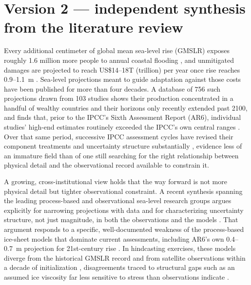 \documentclass[12pt]{article}
\begin{document}
\section*{Version 2 --- independent synthesis from the literature review}

Every additional centimeter of global mean sea-level rise (GMSLR) exposes
roughly 1.6 million more people to annual coastal flooding
\citep{Kulp2019}, and unmitigated damages are projected to reach
US\$14--18T (trillion) per year once rise reaches 0.9--1.1~m
\citep{Jevrejeva2018}. Sea-level projections meant to guide adaptation
against those costs have been published for more than four decades. A
database of 756 such projections drawn from 103 studies shows their
production concentrated in a handful of wealthy countries and their
horizons only recently extended past 2100, and finds that, prior to the
IPCC's Sixth Assessment Report (AR6), individual studies' high-end
estimates routinely exceeded the IPCC's own central ranges
\citep{Garner2026}. Over that same period, successive IPCC assessment
cycles have revised their component treatments and uncertainty structure
substantially \citep{Slangen2022,Garner2018}, evidence less of an immature
field than of one still searching for the right relationship between
physical detail and the observational record available to constrain it.

A growing, cross-institutional view holds that the way forward is not more
physical detail but tighter observational constraint. A recent synthesis
spanning the leading process-based and observational sea-level research
groups argues explicitly for narrowing projections with data and for
characterizing uncertainty structure, not just magnitude, in both the
observations and the models \citep{Felikson2025}. That argument responds
to a specific, well-documented weakness of the process-based ice-sheet
models that dominate current assessments, including AR6's own 0.4--0.7~m
projection for 21st-century rise \citep{Fox-Kemper2021}. In hindcasting
exercises, these models diverge from the historical GMSLR record
\citep{Aschwanden2021} and from satellite observations within a decade of
initialization \citep{Fricker2025}, disagreements traced to structural
gaps such as an assumed ice viscosity far less sensitive to stress than
observations indicate \citep{Millstein2022,GetraerMorlighem2025}.
\end{document}
